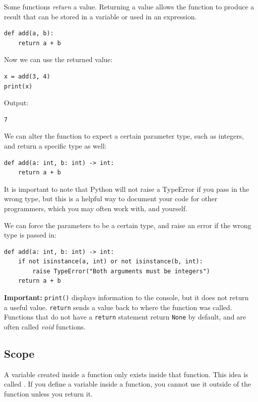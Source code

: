 Some functions \emph{return} a value. Returning a value allows the function to produce a result
that can be stored in a variable or used in an expression.

\begin{verbatim}
def add(a, b):
    return a + b
\end{verbatim}

Now we can use the returned value:

\begin{verbatim}
x = add(3, 4)
print(x)
\end{verbatim}

Output:
\begin{verbatim}
7
\end{verbatim}


We can alter the function to expect a certain parameter type, such as integers, and return a specific type as well:
\begin{verbatim}
def add(a: int, b: int) -> int:
    return a + b
\end{verbatim}

It is important to note that Python will not raise a TypeError if you pass in the wrong type, but this is a helpful way to document your code for other programmers, which you may often work with, and yourself.

We can force the parameters to be a certain type, and raise an error if the wrong type is passed in:
\begin{verbatim}
def add(a: int, b: int) -> int:
    if not isinstance(a, int) or not isinstance(b, int):
        raise TypeError("Both arguments must be integers")
    return a + b
\end{verbatim}


\textbf{Important:} \texttt{print()} displays information to the console, but it does not return a useful value.
\texttt{return} sends a value back to where the function was called. Functions that do not have a \texttt{return} statement return \texttt{None} by default, and are often called \emph{void} functions.

\subsection{Scope}
A variable created inside a function only exists inside that function. This idea is called .
If you define a variable inside a function, you cannot use it outside of the function unless you return it.

